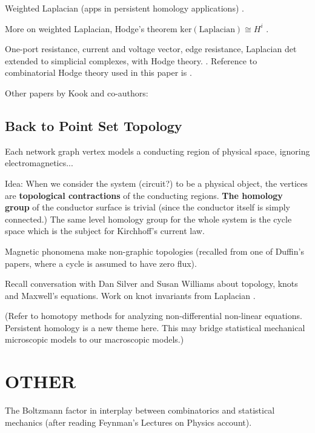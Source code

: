 \documentclass{article}
\begin{document}
Weighted Laplacian (apps in persistent homology applications)
\cite{WuWeightedCoHLaplacian}.

More on weighted Laplacian, Hodge's theorem
$\text{ker}(\text{Laplacian}) \cong H^i$
\cite{HorakJostSpecCombLaplaceWeightedToo}.

One-port resistance, current and voltage vector, edge resistance, Laplacian det
extended to simplicial complexes, with Hodge theory. \cite{KOOK201871}.  Reference
to combinatorial Hodge theory used in this paper is \cite{MR1622290}.

Other papers by Kook and co-authors:
\cite{AALIPOUR2018362,KOOK2011417,KOOK201659,KHO2017278}




\subsection{Back to Point Set Topology}

Each network graph vertex models a conducting region of physical space, 
ignoring electromagnetics...

Idea: When we consider the system (circuit?) to be a physical object, the 
vertices are \textbf{topological contractions} of the conducting regions.
\textbf{The homology group} of the conductor surface is trivial (since the
conductor itself is simply connected.)   The same level homology group for 
the whole system is the cycle space which is the subject for Kirchhoff's 
current law.

Magnetic phonomena make non-graphic topologies (recalled from one of 
Duffin's papers, where a cycle is assumed to have zero flux).

Recall conversation with Dan Silver and Susan Williams about topology, knots and Maxwell's equations.  Work on knot invariants from Laplacian
\cite{SilverWilliamsKnotLaplacian}.

(Refer to homotopy methods for analyzing non-differential non-linear 
equations.  Persistent homology is a new theme here.  This may bridge
statistical mechanical microscopic models to our macroscopic models.)

\section{OTHER}

The Boltzmann factor in interplay between combinatorics and statistical
mechanics (after reading Feynman's Lectures on Physics account).
\end{document}
